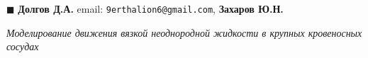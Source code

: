 \documentclass[11pt]{amsart}
\begin{document}

\newcommand{\RR}{\mathbb{R}}
\newcommand{\NN}{\mathbb{N}}



 \vspace{0.5cm}


%
%

$\blacksquare$ {\bf Долгов Д.А.} {\small email: {\tt 9erthalion6@gmail.com}}, 
{\bf Захаров Ю.Н.}\\


\begin{center}
{\textit {\large Моделирование движения вязкой неоднородной жидкости в крупных кровеносных сосудах}} 
\end{center}

\vspace{0.1 in} 

   


  \vspace{0.2 in} 


\end{document}
